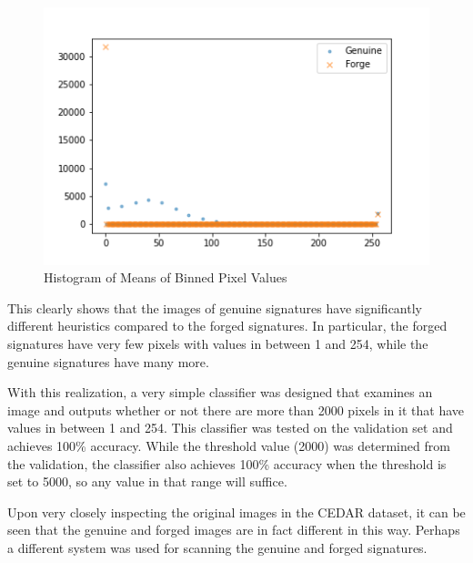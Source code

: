 \begin{figure}[h]
    \begin{center}
        \includegraphics[width=0.8\linewidth]{mean_hist.png}
    \end{center}
    \caption{Histogram of Means of Binned Pixel Values}
    \label{fig:hist_pixel_values}
\end{figure}

This clearly shows that the images of genuine signatures have significantly different heuristics compared to the forged signatures.
In particular, the forged signatures have very few pixels with values in between 1 and 254, while the genuine signatures have many more.

With this realization, a very simple classifier was designed that examines an image and outputs whether or not there are more than 2000 pixels in it that have values in between 1 and 254.
This classifier was tested on the validation set and achieves 100\% accuracy.
While the threshold value (2000) was determined from the validation, the classifier also achieves 100\% accuracy when the threshold is set to 5000, so any value in that range will suffice.

Upon very closely inspecting the original images in the CEDAR dataset, it can be seen that the genuine and forged images are in fact different in this way.
Perhaps a different system was used for scanning the genuine and forged signatures.
